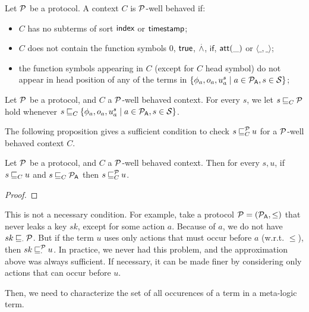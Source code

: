\begin{definition}
  Let $\mathcal{P}$ be a protocol. A context $C$ is $\mathcal{P}$-well behaved if:
  \begin{itemize}
  \item $C$ has no subterms of sort $\textsf{index}$ or $\textsf{timestamp}$;
  \item $C$ does not contain the function symbols $0$, $\textsf{true}$, $\stackrel{.}{\wedge}$, $\mathsf{if}$, $\mathsf{att}(\_)$ or $\langle \_,\_\rangle$;
  \item the function symbols appearing in $C$ (except for $C$ head symbol) do not appear in head position of any of the terms in $\{\phi_a,o_a,u^s_a \mid a \in \mathcal{P}_{\textsf{A}}, s \in\mathcal{S}\}$;
  \end{itemize}
\end{definition}

\begin{definition}
  Let $\mathcal{P}$ be a protocol, and $C$ a $\mathcal{P}$-well behaved context. For every $s$, we let $s \mathbin{\sqsubseteq}_{C} \mathcal{P}$ hold whenever $s \mathbin{\sqsubseteq}_{C} \{\phi_a,o_a,u^s_a \mid a \in \mathcal{P}_{\textsf{A}}, s \in\mathcal{S}\}$.
\end{definition}

The following proposition gives a sufficient condition to check $s \mathbin{\sqsubseteq}^{\mathcal{P}}_{C} u$ for a $\mathcal{P}$-well behaved context $C$.

\begin{proposition}
  Let $\mathcal{P}$ be a protocol, and $C$ a $\mathcal{P}$-well behaved context. Then for every $s,u$, if $s \mathbin{\sqsubseteq}_{C} u$ and $s \mathbin{\sqsubseteq}_{C} \mathcal{P}_{\textsf{A}}$ then $s \mathbin{\sqsubseteq}^{\mathcal{P}}_{C} u$.
\end{proposition}

\begin{proof}
\end{proof}

\begin{remark}
  This is not a necessary condition. For example, take a protocol $\mathcal{P} = (\mathcal{P}_{\textsf{A}},\le)$ that never leaks a key $sk$, except for some action $a$. Because of $a$, we do not have $sk \mathbin{\sqsubseteq}_{\cdot} \mathcal{P}$. But if the term $u$ uses only actions that must occur before $a$ (w.r.t. $\le$), then $sk \mathbin{\sqsubseteq}^{\mathcal{P}}_{\cdot} u$. In practice, we never had this problem, and the approximation above was always sufficient. If necessary, it can be made finer by considering only actions that can occur before $u$.
\end{remark}

Then, we need to characterize the set of all occurences of a term in a meta-logic term.

